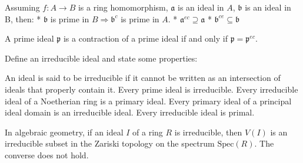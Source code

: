 Assuming \( f : A \to B  \) is a ring homomorphism, \( \mathfrak{a} \) is an ideal in \( A \), \( \mathfrak{b} \) is an ideal in B, then:
* \( \mathfrak{b} \) is prime in \( B \Rightarrow \mathfrak{b}^c\) is prime in \( A \).
* \( \mathfrak{a}^{ec} \supseteq \mathfrak{a}\)
* \( \mathfrak{b}^{ce} \subseteq \mathfrak{b}\)

A prime ideal \( \mathfrak{p} \) is a contraction of a prime ideal if and only if \( \mathfrak{p} = \mathfrak{p}^{ec} \).

Define an irreducible ideal and state some properties:

An ideal is said to be irreducible if it cannot be written as an intersection of ideals that properly contain it.
Every prime ideal is irreducible.
Every irreducible ideal of a Noetherian ring is a primary ideal.
Every primary ideal of a principal ideal domain is an irreducible ideal.
Every irreducible ideal is primal.

In algebraic geometry, if an ideal 
\( I \) of a ring \( R \) is irreducible, then 
\( V(I) \) is an irreducible subset in the Zariski topology on the spectrum 
\( \text{Spec}(R) \). The converse does not hold.
